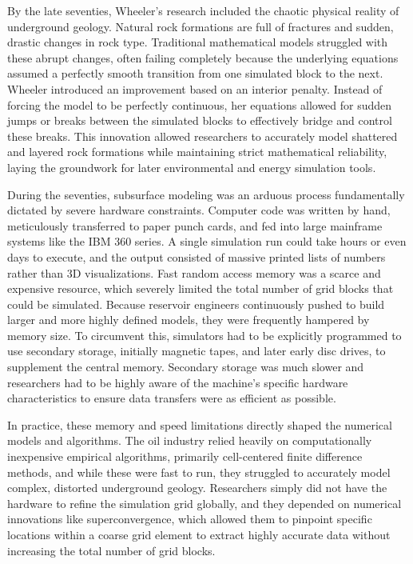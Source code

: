 By the late seventies, Wheeler’s research included the chaotic physical reality of underground geology. Natural rock formations are full of fractures and sudden, drastic changes in rock type. Traditional mathematical models struggled with these abrupt changes, often failing completely because the underlying equations assumed a perfectly smooth transition from one simulated block to the next. Wheeler introduced an improvement based on an interior penalty. Instead of forcing the model to be perfectly continuous, her equations allowed for sudden jumps or breaks between the simulated blocks to effectively bridge and control these breaks. This innovation allowed researchers to accurately model shattered and layered rock formations while maintaining strict mathematical reliability, laying the groundwork for later environmental and energy simulation tools.

During the seventies, subsurface modeling was an arduous process fundamentally dictated by severe hardware constraints. Computer code was written by hand, meticulously transferred to paper punch cards, and fed into large mainframe systems like the IBM 360 series. A single simulation run could take hours or even days to execute, and the output consisted of massive printed lists of numbers rather than 3D visualizations. Fast random access memory was a scarce and expensive resource, which severely limited the total number of grid blocks that could be simulated. Because reservoir engineers continuously pushed to build larger and more highly defined models, they were frequently hampered by memory size. To circumvent this, simulators had to be explicitly programmed to use secondary storage, initially magnetic tapes, and later early disc drives, to supplement the central memory. Secondary storage was much slower and researchers had to be highly aware of the machine's specific hardware characteristics to ensure data transfers were as efficient as possible.

In practice, these memory and speed limitations directly shaped the numerical models and algorithms. The oil industry relied heavily on computationally inexpensive empirical algorithms, primarily cell-centered finite difference methods, and while these were fast to run, they struggled to accurately model complex, distorted underground geology. Researchers simply did not have the hardware to refine the simulation grid globally, and they depended on numerical innovations like superconvergence, which allowed them to pinpoint specific locations within a coarse grid element to extract highly accurate data without increasing the total number of grid blocks.


